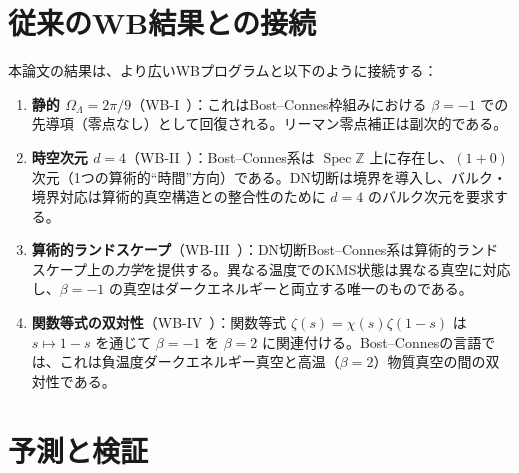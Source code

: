 \documentclass[12pt,a4paper]{article}
\newcommand{\Spec}{\operatorname{Spec}}
\newcommand{\OL}{\Omega_\Lambda}
\begin{document}
\section{従来のWB結果との接続}
\label{sec:connection}

本論文の結果は、より広いWBプログラムと以下のように接続する：

\begin{enumerate}[label=(\roman*)]
\item \textbf{静的 $\OL = 2\pi/9$}（WB-I~\cite{WB-I}）：これはBost--Connes枠組みにおける $\beta = -1$ での先導項（零点なし）として回復される。リーマン零点補正は副次的である。

\item \textbf{時空次元 $d=4$}（WB-II~\cite{WB-II}）：Bost--Connes系は $\Spec\mathbb{Z}$ 上に存在し、$(1+0)$次元（1つの算術的``時間''方向）である。DN切断は境界を導入し、バルク・境界対応は算術的真空構造との整合性のために $d = 4$ のバルク次元を要求する。

\item \textbf{算術的ランドスケープ}（WB-III~\cite{WB-III}）：DN切断Bost--Connes系は算術的ランドスケープ上の\emph{力学}を提供する。異なる温度でのKMS状態は異なる真空に対応し、$\beta = -1$ の真空はダークエネルギーと両立する唯一のものである。

\item \textbf{関数等式の双対性}（WB-IV~\cite{WB-IV}）：関数等式 $\zeta(s) = \chi(s)\zeta(1-s)$ は $s \mapsto 1-s$ を通じて $\beta = -1$ を $\beta = 2$ に関連付ける。Bost--Connesの言語では、これは負温度ダークエネルギー真空と高温（$\beta = 2$）物質真空の間の双対性である。
\end{enumerate}

\section{予測と検証}
\label{sec:predictions}
\end{document}
